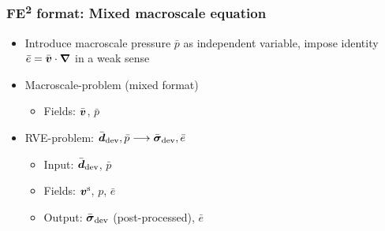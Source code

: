 \documentclass[11pt]{beamer} %
\begin{document}
\begin{frame}
 \frametitle{FE\textsuperscript{2} format: Mixed macroscale equation}
 \begin{itemize}
  \item Introduce macroscale pressure $\bar{p}$ as independent variable, impose identity $\bar{e} = \bar{\boldsymbol{v}}\cdot \boldsymbol{\nabla}$ in a weak sense
 \end{itemize}

 \begin{itemize}
  \item Macroscale-problem (mixed format)
  \begin{itemize}
   \item Fields: $\bar{\boldsymbol{v}}$, $\bar{p}$%
  \end{itemize}
  \item RVE-problem: $\bar{\boldsymbol{d}}_{\mathrm{dev}}, \bar{p} \longrightarrow \bar{\boldsymbol{\sigma}}_{\mathrm{dev}}, \bar{e}$
  \begin{itemize}
   \item Input: $\bar{\boldsymbol{d}}_{\mathrm{dev}}$, $\bar{p}$
   \item Fields: $\boldsymbol{v}^{\mathrm{s}}$, $p$, $\bar{e}$%
   \item Output: $\bar{\boldsymbol{\sigma}}_{\mathrm{dev}}$ (post-processed), $\bar{e}$
  \end{itemize}
 \end{itemize}

\end{frame}
\end{document}
